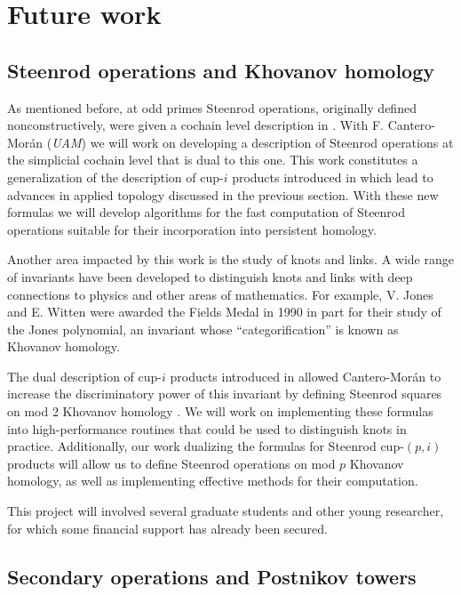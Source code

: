 
\section{Future work} \label{s:future}

\subsection{Steenrod operations and Khovanov homology}

As mentioned before, at odd primes Steenrod operations, originally defined nonconstructively, were given a cochain level description in \cite{medina2020maysteenrod}.
With F. Cantero-Mor\'{a}n (\textit{UAM}) we will work on developing a description of Steenrod operations at the simplicial cochain level that is dual to this one.
This work constitutes a generalization of the description of cup-$i$ products introduced in \cite{medina2021newformulas} which lead to advances in applied topology discussed in the previous section.
With these new formulas we will develop algorithms for the fast computation of Steenrod operations suitable for their incorporation into persistent homology.

Another area impacted by this work is the study of knots and links.
A wide range of invariants have been developed to distinguish knots and links with deep connections to physics and other areas of mathematics.
For example, V. Jones and E. Witten were awarded the Fields Medal in 1990 in part for their study of the Jones polynomial, an invariant whose ``categorification'' is known as Khovanov homology.

The dual description of cup-$i$ products introduced in \cite{medina2021newformulas} allowed Cantero-Mor\'{a}n to increase the discriminatory power of this invariant by defining Steenrod squares on mod 2 Khovanov homology \cite{cantero-moran2020khovanov}.
We will work on implementing these formulas into high-performance routines that could be used to distinguish knots in practice.
Additionally, our work dualizing the formulas for Steenrod cup-$(p,i)$ products will allow us to define Steenrod operations on mod $p$ Khovanov homology, as well as implementing effective methods for their computation.

This project will involved several graduate students and other young researcher, for which some financial support has already been secured.

\subsection{Secondary operations and Postnikov towers}

